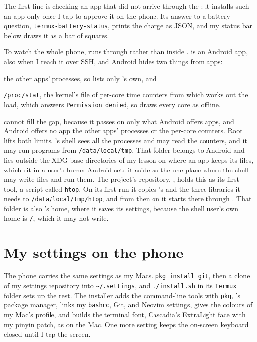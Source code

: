 \documentclass[11pt,a4paper]{article}
\begin{document}
The first line is  checking an app that did not arrive through the : it installs such an app only once I tap to approve it on the phone. Its answer to a battery question, \texttt{termux-battery-status}, prints the charge as JSON, and my  status bar below draws it as a bar of squares.

To watch the whole phone,  runs through  rather than inside .  is an Android app, also when I reach it over SSH, and Android hides two things from apps: \begin{enumerate*}[label=(\arabic*)] \item the other apps' processes, so  lists only 's own, and \item \texttt{/proc/stat}, the kernel's file of per-core time counters from which  works out the load, which answers \texttt{Permission denied}, so  draws every core as offline.\end{enumerate*}   cannot fill the gap, because it passes on only what Android offers apps, and Android offers no app the other apps' processes or the per-core counters. Root lifts both limits. 's shell sees all the processes and may read the counters, and it may run programs from \texttt{/data/local/tmp}. That folder belongs to Android and lies outside the XDG base directories of my lesson on where an app keeps its files, which sit in a user's home: Android sets it aside as the one place where the  shell may write files and run them. The project's repository, , holds this as its first tool, a script called \texttt{htop}. On its first run it copies 's  and the three libraries it needs to \texttt{/data/local/tmp/htop}, and from then on it starts  there through . That folder is also 's home, where it saves its settings, because the shell user's own home is \texttt{/}, which it may not write.


\section*{My settings on the phone}

The phone carries the same settings as my Macs. \texttt{pkg install git}, then a clone of my settings repository into \texttt{\textasciitilde/.settings}, and \texttt{./install.sh} in its \texttt{Termux} folder sets up the rest. The installer adds the command-line tools with \texttt{pkg}, 's package manager, links my \texttt{bashrc}, Git, and Neovim settings, gives  the colours of my Mac's  profile, and builds the terminal font, Cascadia's ExtraLight face with my pinyin patch, as on the Mac. One more setting keeps the on-screen keyboard closed until I tap the screen.
\end{document}
